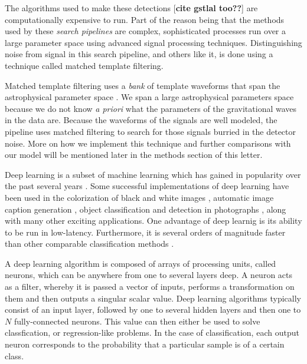 \documentclass[%
 amsmath,amssymb,
 aps,
 twocolumn,
 prl,
 reprint,
floatfix,
]{revtex4-1}
\begin{document}
The algorithms used to make these detections \cite{0264-9381-33-21-215004} [\textbf{cite gstlal too??}] are computationally expensive to run. Part of the reason being that the methods used by these \textit{search pipelines} are complex, sophisticated processes run over a large parameter space using advanced signal processing techniques. Distinguishing noise from signal in this search pipeline, and others like it, is done using a technique called matched template filtering. 

Matched template filtering uses a \textit{bank} of template waveforms that span the astrophysical parameter space \cite{PhysRevD.44.3819, PhysRevD.49.1707, PhysRevD.53.6749, PhysRevD.60.022002, 0264-9381-23-18-002, PhysRevD.80.104014, PhysRevD.86.084017, PhysRevD.89.084041, PhysRevD.87.124003, 1307.4158, PhysRevD.89.024003, PhysRevD.93.124007}. We span a large astrophysical parameters space because we do not know \textit{a priori} what the parameters of the gravitational waves in the data are. Because the waveforms of the signals are well modeled, the pipeline uses matched filtering to search for those signals burried in the detector noise. More on how we implement this technique and further comparisons with our model will be mentioned later in the methods section of this letter.

Deep learning is a subset of machine learning which has gained in popularity over the past several years \cite{NIPS2012_4824, 1406.2661, 1409.1556, 1412.7062, 1311.2901, 1409.4842}. Some successful implementations of deep learning have been used in the colorization of black and white images \cite{1603.08511}, automatic image caption generation \cite{1412.2306}, object classification and detection in photographs \cite{NIPS2012_4824}, along with many other exciting applications. One advantage of deep learnig is its ability to be run in low-latency. Furthermore, it is several orders of magnitude faster than other comparable classification methods \cite{726791}. 

A deep learning algorithm is composed of arrays of processing units, called neurons, which can be anywhere from one to several layers deep. A neuron acts as a filter, whereby it is passed a vector of inputs, performs a transformation on them and then outputs a singular scalar value. Deep learning algorithms typically consist of an input layer, followed by one to several hidden layers and then one to $N$ fully-connected neurons. This value can then either be used to solve classfication, or regression-like problems. In the case of classification, each output neuron corresponds to the probability that a particular sample is of a certain class. 
\end{document}
